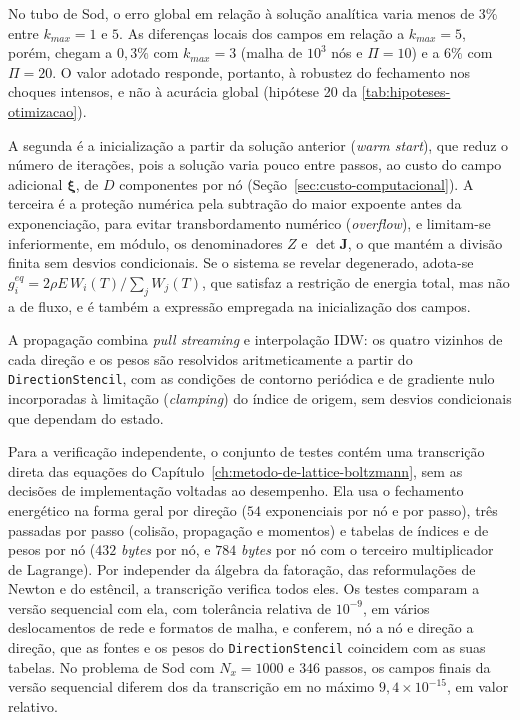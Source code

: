 No tubo de Sod, o erro global em relação à solução analítica varia menos de $3\%$ entre $k_{max} = 1$ e $5$.
As diferenças locais dos campos em relação a $k_{max} = 5$, porém, chegam a $0{,}3\%$ com $k_{max} = 3$ (malha de $10^3$ nós e $\Pi = 10$) e a $6\%$ com $\Pi = 20$.
O valor adotado responde, portanto, à robustez do fechamento nos choques intensos, e não à acurácia global (hipótese 20 da \autoref{tab:hipoteses-otimizacao}).

A segunda é a inicialização a partir da solução anterior (\textit{warm start}), que reduz o número de iterações, pois a solução varia pouco entre passos, ao custo do campo adicional $\boldsymbol{\xi}$, de $D$ componentes por nó (Seção~\ref{sec:custo-computacional}).
A terceira é a proteção numérica pela subtração do maior expoente antes da exponenciação, para evitar transbordamento numérico (\textit{overflow}), e limitam-se inferiormente, em módulo, os denominadores $Z$ e $\det \mathbf{J}$, o que mantém a divisão finita sem desvios condicionais.
Se o sistema se revelar degenerado, adota-se $g_i^{eq} = 2\rho E\, W_i(T) / \sum_j W_j(T)$, que satisfaz a restrição de energia total, mas não a de fluxo, e é também a expressão empregada na inicialização dos campos.

A propagação combina \textit{pull streaming} e interpolação IDW: os quatro vizinhos de cada direção e os pesos são resolvidos aritmeticamente a partir do \texttt{DirectionStencil}, com as condições de contorno periódica e de gradiente nulo incorporadas à limitação (\textit{clamping}) do índice de origem, sem desvios condicionais que dependam do estado.

Para a verificação independente, o conjunto de testes contém uma transcrição direta das equações do Capítulo~\ref{ch:metodo-de-lattice-boltzmann}, sem as decisões de implementação voltadas ao desempenho.
Ela usa o fechamento energético na forma geral por direção ($54$ exponenciais por nó e por passo), três passadas por passo (colisão, propagação e momentos) e tabelas de índices e de pesos por nó ($432$ \textit{bytes} por nó, e $784$ \textit{bytes} por nó com o terceiro multiplicador de Lagrange).
Por independer da álgebra da fatoração, das reformulações de Newton e do estêncil, a transcrição verifica todos eles.
Os testes comparam a versão sequencial com ela, com tolerância relativa de $10^{-9}$, em vários deslocamentos de rede e formatos de malha, e conferem, nó a nó e direção a direção, que as fontes e os pesos do \texttt{DirectionStencil} coincidem com as suas tabelas.
No problema de Sod com $N_x = 1000$ e $346$ passos, os campos finais da versão sequencial diferem dos da transcrição em no máximo $9{,}4 \times 10^{-15}$, em valor relativo.

